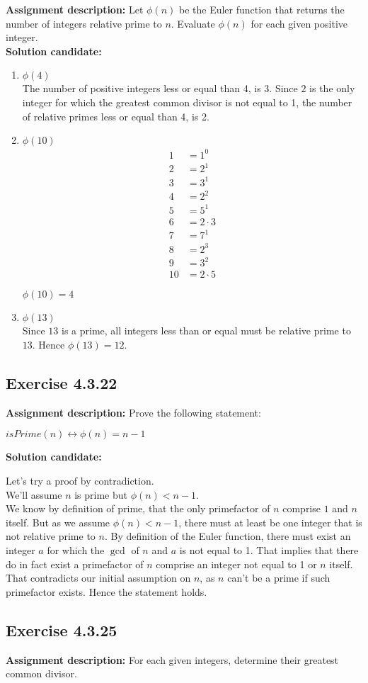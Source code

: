 \documentclass{report}
\newcommand{\cent}[1]{\begin{center}#1\end{center}}
\newcommand{\mAlign}[1]{\begin{align*}#1\end{align*}}
\newcommand{\assignmentDescription}{\textbf{Assignment description: }}
\newcommand{\solution}{\textbf{Solution candidate: }}
\newcommand{\QED}{\boxed{}}
\newcommand{\Exercise}[1]{\subsection{Exercise #1}}
\newcommand{\defaultEnumerateLabel}{\textbf{\alph*.}}
\newcommand{\myItem}[1]{\item #1\\}
\begin{document}
\begin{enumerate}[label=\defaultEnumerateLabel]
	\assignmentDescription
	Let $\phi(n)$ be the Euler function that returns the number of integers relative prime to $n$. Evaluate $\phi(n)$ for each given positive integer.\\
	
	\solution
	
	\begin{enumerate}[label=\defaultEnumerateLabel]
		\myItem{$\phi (4)$}
		
		The number of positive integers less or equal than 4, is 3. Since $2$ is the only integer for which the greatest common divisor is not equal to 1, the number of relative primes less or equal than 4, is 2.
		
		\myItem{$\phi (10)$}
		
		\mAlign{
			1 &= 1^0 \\
			2 &= 2^1\\
			3 &= 3^1\\
			4 &= 2^2 \\
			5 &= 5^1 \\
			6 &= 2 \cdot 3\\
			7 &= 7^1 \\
			8 &= 2^3 \\
			9 &= 3^2 \\
			10 &= 2 \cdot 5 
		}
		
		\cent{$\phi (10) = 4$}
		
		\myItem{$\phi(13)$}
		
		Since $13$ is a prime, all integers less than or equal must be relative prime to $13$. Hence $\phi(13) = 12$.
		
		
		
	\end{enumerate}
	\Exercise{4.3.22}
	
	\assignmentDescription
	Prove the following statement:
	
	\cent{$isPrime(n) \leftrightarrow \phi(n) = n-1$}
	
	\solution
	
	Let's try a proof by contradiction.\\
	
	We'll assume $n$ is prime but $\phi(n) < n-1$. \\
	
	We know by definition of prime, that the only primefactor of $n$ comprise $1$ and $n$ itself. But as we assume $\phi(n) < n-1$, there must at least be one integer that is not relative prime to $n$. By definition of the Euler function, there must exist an integer $a$ for which the $\gcd$ of $n$ and $a$ is not equal to 1. That implies that there do in fact exist a primefactor of $n$ comprise an integer not equal to 1 or $n$ itself. That contradicts our initial assumption on $n$, as $n$ can't be a prime if such primefactor exists. Hence the statement holds.\\
	\QED
	\Exercise{4.3.25}
	\assignmentDescription
	For each given integers, determine their greatest common divisor.\\
	

\end{enumerate}
\end{document}
